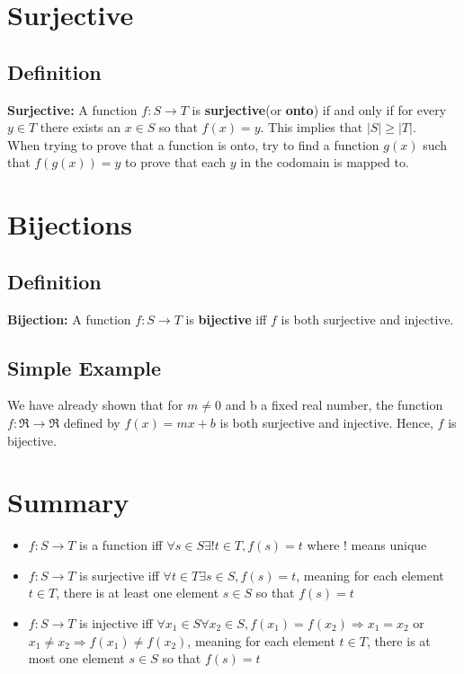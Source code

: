 \documentclass[12pt]{report}
\begin{document}
	\section{Surjective}
		\subsection{Definition}
			\textbf{Surjective:} A function $f:S \rightarrow T$ is \textbf{surjective}(or \textbf{onto}) if and only if for every $y \in T$ there exists an $x \in S $ so that $f(x) = y$. This implies that $|S| \geq |T|$. \\
			When trying to prove that a function is onto, try to find a function $g(x)$ such that $f(g(x)) = y$ to prove that each $y$ in the codomain is mapped to.
	\section{Bijections}
		\subsection{Definition}
			\textbf{Bijection:} A function $f:S \rightarrow T$ is \textbf{bijective} iff $f$ is both surjective and injective.
		\subsection{Simple Example}
			We have already shown that for $m \neq 0$ and b a fixed real number, the function $f:\Re \rightarrow \Re$ defined by $f(x) = mx + b$ is both surjective and injective. Hence, $f$ is bijective.

	\section{Summary}
		\begin{itemize}
			\item $f:S \rightarrow T$ is a function iff $\forall s \in S \exists !t \in T, f(s) = t$ where ! means unique
			\item $f:S \rightarrow T$ is surjective iff $\forall t \in T \exists s \in S, f(s) = t$, meaning for each element $t \in T$, there is at least one element $s \in S$ so that $f(s) = t$			

			\item $f:S \rightarrow T$ is injective iff $\forall x_1 \in S \forall x_2 \in S, f(x_1) = f(x_2) \Rightarrow x_1 = x_2$ or $x_1 \neq x_2 \Rightarrow f(x_1) \neq f(x_2)$, meaning for each element $t \in T$, there is at most one element $s \in S$ so that $f(s) = t$			
		\end{itemize}
\end{document}
